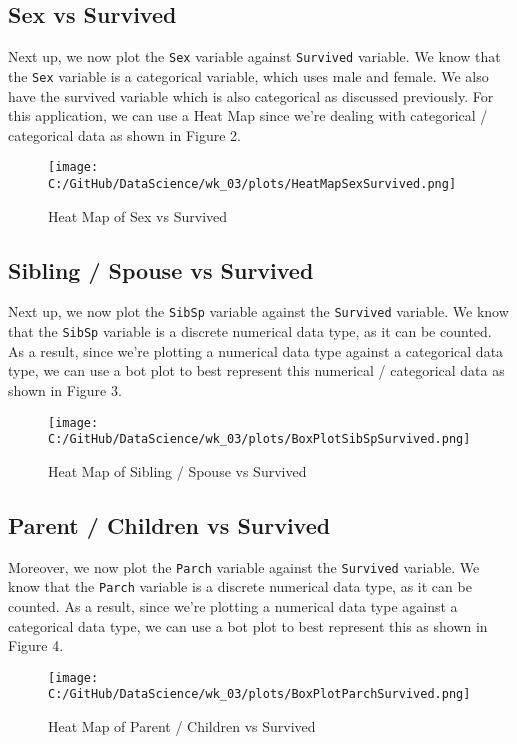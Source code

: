 \documentclass[a4paper, twocolumn]{article}
\begin{document}
\subsection{Sex vs Survived}
Next up, we now plot the \texttt{Sex} variable against \texttt{Survived} variable. We know that the \texttt{Sex}
variable is a categorical variable, which uses male and female. We also have the survived variable which is also
categorical as discussed previously. For this application, we can use a Heat Map since we're dealing with categorical
/ categorical data as shown in Figure 2.
\begin{figure}[h!] 
    \centering
    \noindent
    \texttt{[image: C:/GitHub/DataScience/wk\_03/plots/HeatMapSexSurvived.png]}  
    \caption{Heat Map of Sex vs Survived} 
\end{figure}

\subsection{Sibling / Spouse vs Survived}
Next up, we now plot the \texttt{SibSp} variable against the \texttt{Survived} variable. We know that the
\texttt{SibSp} variable is a discrete numerical data type, as it can be counted. As a result, since we're plotting
a numerical data type against a categorical data type, we can use a bot plot to best represent this numerical 
/ categorical data as shown in Figure 3.
\begin{figure}[h!] 
    \centering
    \noindent
    \texttt{[image: C:/GitHub/DataScience/wk\_03/plots/BoxPlotSibSpSurvived.png]}  
    \caption{Heat Map of Sibling / Spouse vs Survived} 
\end{figure}

\subsection{Parent / Children vs Survived}
Moreover, we now plot the \texttt{Parch} variable against the \texttt{Survived} variable. We know that the 
\texttt{Parch} variable is a discrete numerical data type, as it can be counted. As a result, since we're plotting
a numerical data type against a categorical data type, we can use a bot plot to best represent this as shown in 
Figure 4.
\begin{figure}[h!] 
    \centering
    \noindent
    \texttt{[image: C:/GitHub/DataScience/wk\_03/plots/BoxPlotParchSurvived.png]}  
    \caption{Heat Map of Parent / Children vs Survived} 
\end{figure}
\end{document}

